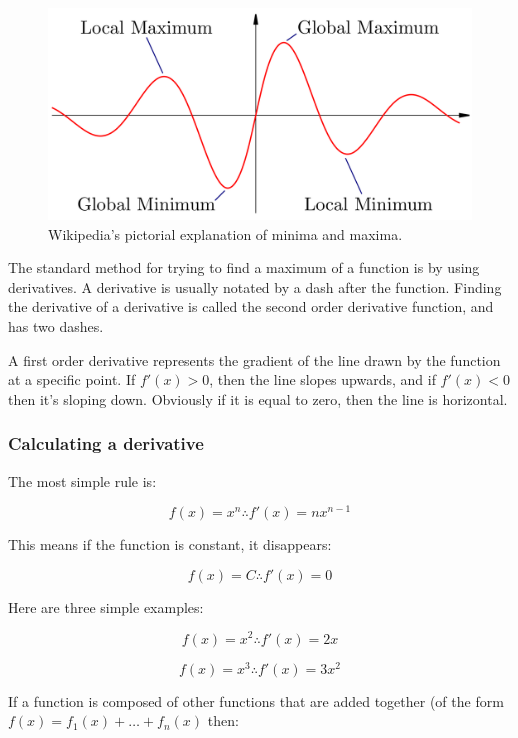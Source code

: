 \begin{figure}
  \centering
  \includegraphics[width=\textwidth]{images/maxima}
  \caption{Wikipedia's pictorial explanation of minima and maxima.}
  \label{fig:maxima}
\end{figure}

The standard method for trying to find a maximum of a function is by using
derivatives. A derivative is usually notated by a dash after the function.
Finding the derivative of a derivative is called the second order derivative
function, and has two dashes.

A first order derivative represents the gradient of the line drawn by the
function at a specific point. If $f'(x) > 0$, then the line slopes upwards, and
if $f'(x) < 0$ then it's sloping down. Obviously if it is equal to zero, then
the line is horizontal.


\subsubsection{Calculating a derivative}

The most simple rule is: 

\[
  f(x) = x^n \therefore f'(x) = nx^{n-1}
\]

This means if the function is constant, it disappears:

\[
  f(x) = C \therefore f'(x) = 0
\]

Here are three simple examples:

\[
  f(x) = x^2 \therefore f'(x) = 2x
\]

\[
  f(x) = x^3 \therefore f'(x) = 3x^2
\]

If a function is composed of other functions that are added together (of the form $f(x) = f_1(x) + \dots + f_n(x)$ then:

